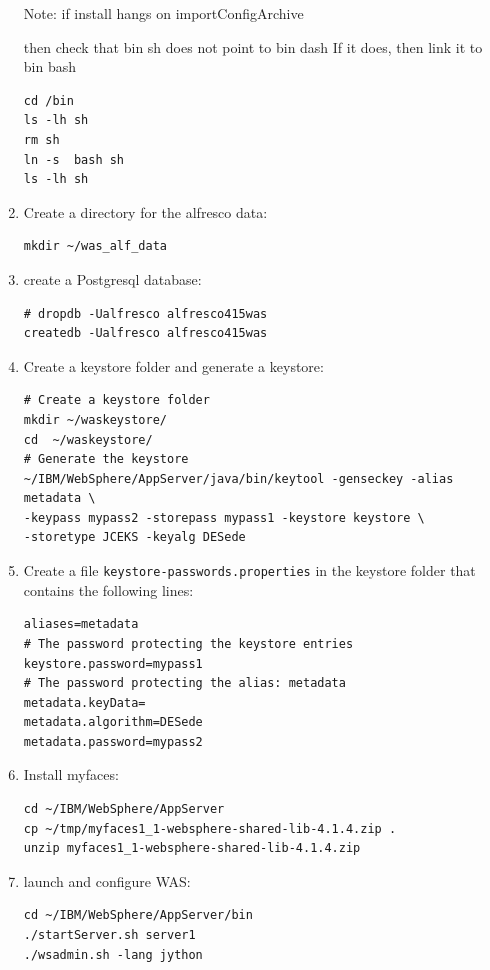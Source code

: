 \documentclass[10pt,a4]{article}
\begin{document}
\begin{enumerate}
Note: if install hangs on importConfigArchive

then check that bin sh does not point to bin dash
If it does, then link it to  bin bash

\begin{verbatim}
cd /bin
ls -lh sh
rm sh
ln -s  bash sh
ls -lh sh
\end{verbatim}


\item Create a directory for the alfresco data:
\begin{verbatim}
mkdir ~/was_alf_data
\end{verbatim}



\item create a Postgresql database:

\begin{verbatim}
# dropdb -Ualfresco alfresco415was
createdb -Ualfresco alfresco415was
\end{verbatim}


\item Create a keystore folder and generate a keystore:

\begin{verbatim}
# Create a keystore folder
mkdir ~/waskeystore/
cd  ~/waskeystore/
# Generate the keystore
~/IBM/WebSphere/AppServer/java/bin/keytool -genseckey -alias metadata \
-keypass mypass2 -storepass mypass1 -keystore keystore \
-storetype JCEKS -keyalg DESede
\end{verbatim}

\item Create a file {\tt keystore-passwords.properties} in the keystore folder that contains the following lines:

\begin{verbatim}
aliases=metadata
# The password protecting the keystore entries
keystore.password=mypass1
# The password protecting the alias: metadata
metadata.keyData=
metadata.algorithm=DESede
metadata.password=mypass2
\end{verbatim}
\item Install myfaces:
\begin{verbatim}
cd ~/IBM/WebSphere/AppServer
cp ~/tmp/myfaces1_1-websphere-shared-lib-4.1.4.zip .
unzip myfaces1_1-websphere-shared-lib-4.1.4.zip 
\end{verbatim}

\item launch and configure WAS:
\begin{verbatim}
cd ~/IBM/WebSphere/AppServer/bin
./startServer.sh server1
./wsadmin.sh -lang jython 


\end{verbatim}
\end{enumerate}
\end{document}
